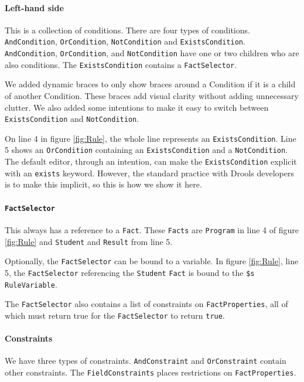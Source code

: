 \paragraph{Left-hand side} This is a collection of conditions.
There are four types of conditions.
\texttt{AndCondition}, \texttt{OrCondition}, \texttt{NotCondition} and \texttt{ExistsCondition}.
\texttt{AndCondition}, \texttt{OrCondition}, and \texttt{NotCondition} have one or two children who are also conditions.
The \texttt{ExistsCondition} contains a \texttt{FactSelector}.

We added dynamic braces to only show braces around a Condition if it is a child of another Condition.
These braces add visual clarity without adding unnecessary clutter.
We also added some intentions to make it easy to switch between \texttt{ExistsCondition} and \texttt{NotCondition}.

On line 4 in figure \ref{fig:Rule}, the whole line represents an \texttt{ExistsCondition}.
Line 5 shows an \texttt{OrCondition} containing an \texttt{ExistsCondition} and a \texttt{NotCondition}.
The default editor, through an intention, can make the \texttt{ExistsCondition} explicit with an \texttt{exists} keyword.
However, the standard practice with Drools developers is to make this implicit, so this is how we show it here.

\paragraph{\texttt{FactSelector}} This always has a reference to a \texttt{Fact}.
These \texttt{Facts} are \texttt{Program} in line 4 of figure \ref{fig:Rule} and \texttt{Student} and \texttt{Result} from line 5.

Optionally, the \texttt{FactSelector} can be bound to a variable.
In figure \ref{fig:Rule}, line 5, the \texttt{FactSelector} referencing the \texttt{Student} \texttt{Fact} is bound to the \texttt{\$s} \texttt{RuleVariable}.

The \texttt{FactSelector} also contains a list of constraints on \texttt{FactProperties}, all of which must return true for the \texttt{FactSelector} to return \texttt{true}.

\paragraph{Constraints} We have three types of constraints.
\texttt{AndConstraint} and \texttt{OrConstraint} contain other constraints.
The \texttt{FieldConstraints} places restrictions on \texttt{FactProperties}.

